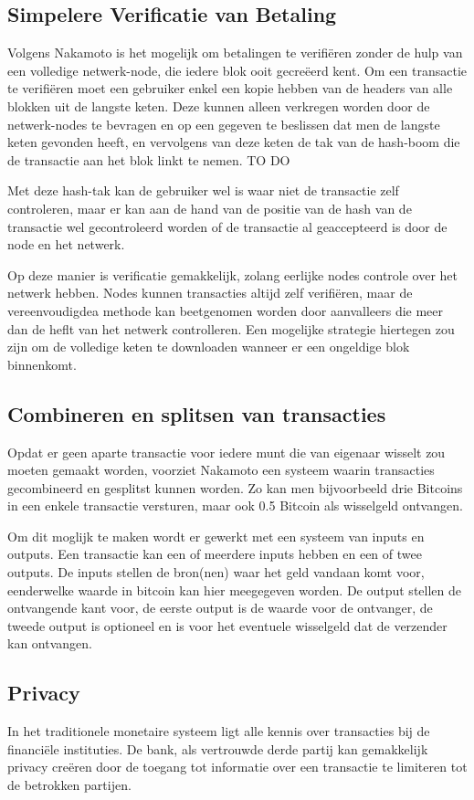 		\subsection{Simpelere Verificatie van Betaling}
		Volgens Nakamoto is het mogelijk om betalingen te verifiëren zonder de hulp van een volledige netwerk-node, die iedere blok ooit gecreëerd kent. Om een transactie te verifiëren moet een gebruiker enkel een kopie hebben van de headers van alle blokken uit de langste keten. Deze kunnen alleen verkregen worden door de netwerk-nodes te bevragen en op een gegeven te beslissen dat men de langste keten gevonden heeft, en vervolgens van deze keten de tak van de hash-boom die de transactie aan het blok linkt te nemen.  TO DO
	
		Met deze hash-tak kan de gebruiker wel is waar niet de transactie zelf controleren, maar er kan aan de hand van de positie van de hash van de transactie wel gecontroleerd worden of de transactie al geaccepteerd is door de node en het netwerk.
		
		Op deze manier is verificatie gemakkelijk, zolang eerlijke nodes controle over het netwerk hebben. Nodes kunnen transacties altijd zelf verifiëren, maar de vereenvoudigdea methode kan beetgenomen worden door aanvalleers die meer dan de heflt van het netwerk controlleren. Een mogelijke strategie hiertegen zou zijn om de volledige keten te downloaden wanneer er een ongeldige blok binnenkomt. 
	\subsection{Combineren en splitsen van transacties}
	Opdat er geen aparte transactie voor iedere munt die van eigenaar wisselt zou moeten gemaakt worden, voorziet Nakamoto een systeem waarin transacties gecombineerd en gesplitst kunnen worden. Zo kan men bijvoorbeeld drie Bitcoins in een enkele transactie versturen, maar ook 0.5 Bitcoin als wisselgeld ontvangen.
	
	Om dit moglijk te maken wordt er gewerkt met een systeem van inputs en outputs. Een transactie kan een of meerdere inputs hebben en een of twee outputs. De inputs stellen de bron(nen) waar het geld vandaan komt voor, eenderwelke waarde in bitcoin kan hier meegegeven worden. De output stellen de ontvangende kant voor, de eerste output is de waarde voor de ontvanger, de tweede output is optioneel en is voor het eventuele wisselgeld dat de verzender kan ontvangen.
	\subsection{Privacy}
	In het traditionele monetaire systeem ligt alle kennis over transacties bij de financiële instituties. De bank, als vertrouwde derde partij kan gemakkelijk privacy creëren door de toegang tot informatie over een transactie te limiteren tot de betrokken partijen. 
	
